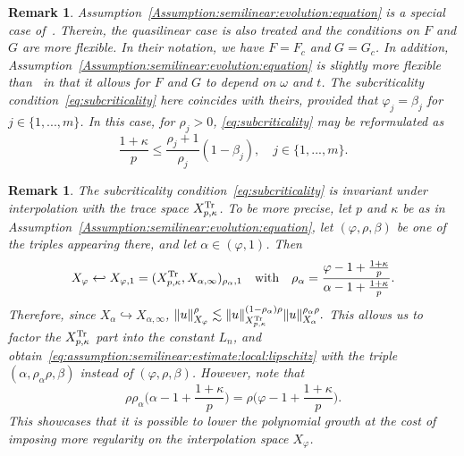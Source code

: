 \documentclass[reqno]{amsart}
\newtheorem{remark}[Satz]{Remark}
\newcommand{\1}{\mathbf{1}}
\begin{document}
\begin{remark}\label{rem:assumption:semilinear:evolution:equation}
    Assumption~\ref{Assumption:semilinear:evolution:equation} is a special case of~\cite[Hypothesis $\mathrm{H}$]{agrestiNonlinearParabolicStochastic2022a}. Therein, the quasilinear case is also treated and the conditions on $F$ and $G$ are more flexible. In their notation, we have $F=F_c$ and $G=G_c$. 
    In addition, Assumption~\ref{Assumption:semilinear:evolution:equation} is slightly more flexible than~\cite[Assumption 4.1]{agrestiNonlinearSPDEsMaximal2025} in that it allows for $F$  and $ G$ to depend on $\omega$ and $t$. The subcriticality condition~\eqref{eq:subcriticality} here coincides with theirs, provided that $\varphi_j=\beta_j$ for $ j\in\{1,...,m\}$. In this case, for $\rho_j>0$, \eqref{eq:subcriticality} may be reformulated as     \[ \frac{1+\kappa}{p}\le \frac{\rho_j+1}{\rho_j}(1-\beta_j),\quad j\in\{1,...,m\}.\]
\end{remark}
\begin{remark}\label{rem:subcriticality:invariance}
The subcriticality condition~\eqref{eq:subcriticality} is invariant under interpolation with the trace space $X_{p,\kappa}^{\textup{Tr}}$.
     To be more precise, let $p$ and $\kappa$ be as in Assumption~\ref{Assumption:semilinear:evolution:equation}, let $(\varphi,\rho,\beta)$ be one of the triples appearing there, and let $\alpha\in (\varphi,1)$. Then 
    \[X_\varphi \hookleftarrow X_{\varphi,1}=(X_{p,\kappa}^{\textup{Tr}}, X_{\alpha,\infty})_{\rho_\alpha,1}\quad \text{with}\quad\rho_\alpha = \frac{\varphi -1+\frac{1+\kappa}{p}}{\alpha-1+\frac{1+\kappa}{p}}.\]
    Therefore, since $X_\alpha\hookrightarrow X_{\alpha,\infty}$,
    $\| u\|_{X_\varphi}^\rho \lesssim \|u\|_{X_{p,\kappa}^{\textup{Tr}}}^{(1-\rho_\alpha)\rho}\| u\|_{X_{\alpha}}^{\rho_\alpha \rho}.$ This allows us to factor the $X_{p,\kappa}^{\textup{Tr}}$ part into the constant $L_n$, and obtain~\eqref{eq:assumption:semilinear:estimate:local:lipschitz} with the triple $(\alpha, \rho_\alpha \rho,\beta)$ instead of $(\varphi, \rho,\beta)$. 
    However, note that
    \[\rho \rho_\alpha\Big(\alpha-1+\frac{1+\kappa}{p}\Big) = \rho\Big(\varphi-1+\frac{1+\kappa}{p}\Big).\]
    This showcases that it is possible to lower the polynomial growth at the cost of imposing more regularity on the  interpolation space $X_\varphi$.
\end{remark}
\end{document}
